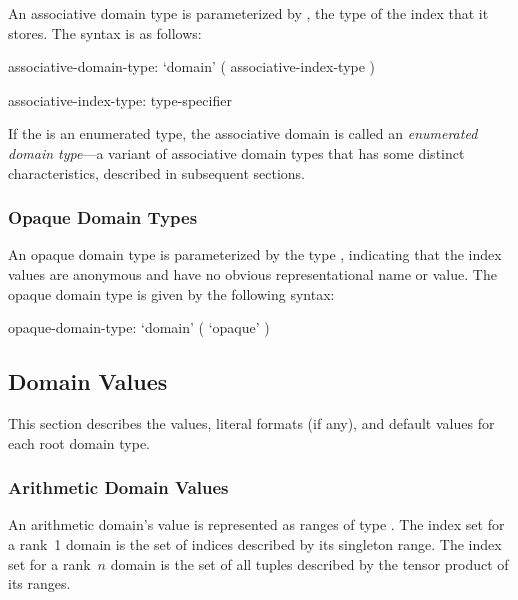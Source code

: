 An associative domain type is parameterized by , the
type of the index that it stores.  The syntax is as follows:

\begin{syntax}
associative-domain-type:
  `domain' ( associative-index-type )

associative-index-type:
  type-specifier
\end{syntax}

%
%


If the  is an enumerated type, the
associative domain is called an \emph{enumerated domain type}---a
variant of associative domain types that has some distinct
characteristics, described in subsequent sections.


\subsubsection{Opaque Domain Types}

An opaque domain type is parameterized by the type ,
indicating that the index values are anonymous and have no obvious
representational name or value.  The opaque domain type is given by
the following syntax:

\begin{syntax}
opaque-domain-type:
  `domain' ( `opaque' )
\end{syntax}


\subsection{Domain Values}

This section describes the values, literal formats (if any), and
default values for each root domain type.

\subsubsection{Arithmetic Domain Values}

An arithmetic domain's value is represented as  ranges of
 type   .  The index set for a rank~1 domain is the set of indices
 described by its singleton range.  The index set for a rank~$n$
 domain is the set of all  tuples described by the
 tensor product of its ranges.

